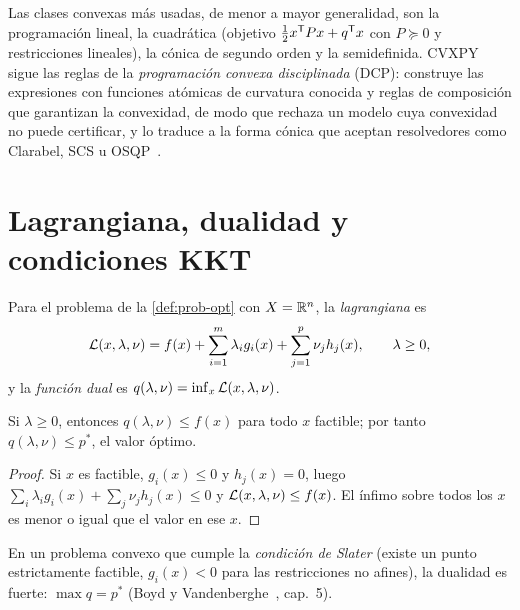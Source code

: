 Las clases convexas más usadas, de menor a mayor generalidad, son la programación lineal, la cuadrática (objetivo $\tfrac12x^{\mathsf{T}} Px+q^{\mathsf{T}} x$ con $P\succeq 0$ y restricciones lineales), la cónica de segundo orden y la semidefinida. CVXPY sigue las reglas de la \emph{programación convexa disciplinada} (DCP): construye las expresiones con funciones atómicas de curvatura conocida y reglas de composición que garantizan la convexidad, de modo que rechaza un modelo cuya convexidad no puede certificar, y lo traduce a la forma cónica que aceptan resolvedores como Clarabel, SCS u OSQP~\cite{cvxpy,cvxpydoc}.

\section{Lagrangiana, dualidad y condiciones KKT}

\begin{definicion}\label{def:lagrangiana}
Para el problema de la \cref{def:prob-opt} con $X=\mathbb{R}^{n}$, la \emph{lagrangiana} es
\[
\mathcal{L}(x,\lambda,\nu)=f(x)+\sum_{i=1}^{m}\lambda_ig_i(x)+\sum_{j=1}^{p}\nu_jh_j(x),\qquad\lambda\ge 0,
\]
y la \emph{función dual} es $q(\lambda,\nu)=\inf_x\mathcal{L}(x,\lambda,\nu)$.
\end{definicion}

\begin{proposicion}\label{prop:dual-debil-conv}
Si $\lambda\ge 0$, entonces $q(\lambda,\nu)\le f(x)$ para todo $x$ factible; por tanto $q(\lambda,\nu)\le p^{*}$, el valor óptimo.
\end{proposicion}

\begin{proof}
Si $x$ es factible, $g_i(x)\le 0$ y $h_j(x)=0$, luego $\sum_i\lambda_ig_i(x)+\sum_j\nu_jh_j(x)\le 0$ y $\mathcal{L}(x,\lambda,\nu)\le f(x)$. El ínfimo sobre todos los $x$ es menor o igual que el valor en ese $x$.
\end{proof}

En un problema convexo que cumple la \emph{condición de Slater} (existe un punto estrictamente factible, $g_i(x)<0$ para las restricciones no afines), la dualidad es fuerte: $\max q=p^{*}$ (Boyd y Vandenberghe~\cite{bv}, cap.~5).


